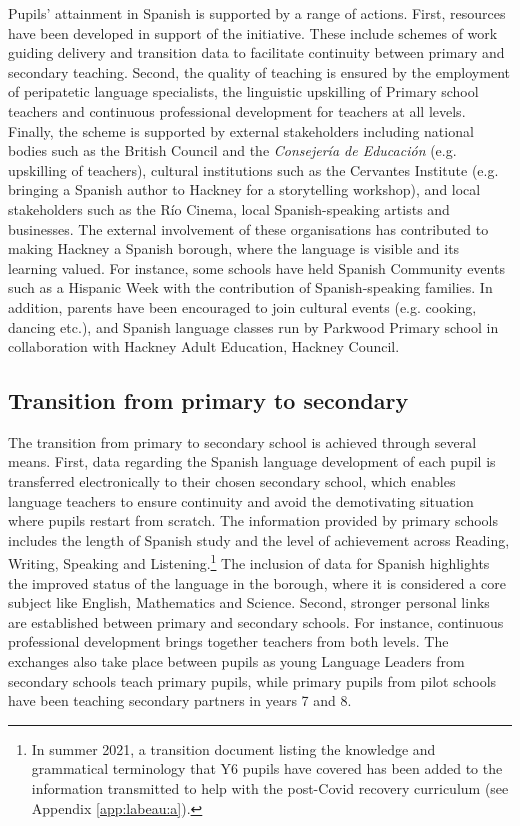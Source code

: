 \documentclass[output=paper]{langscibook}
\begin{document}
Pupils’ attainment in Spanish is supported by a range of actions. First, resources have been developed in support of the initiative. These include schemes of work guiding delivery and transition data to facilitate continuity between primary and secondary teaching. Second, the quality of teaching is ensured by the employment of peripatetic language specialists, the linguistic upskilling of Primary school teachers and continuous professional development for teachers at all levels. Finally, the scheme is supported by external stakeholders including national bodies such as the British Council and the \textit{Consejería de Educación} (e.g. upskilling of teachers), cultural institutions such as the Cervantes Institute (e.g. bringing a Spanish author to Hackney for a storytelling workshop), and local stakeholders such as the Río Cinema, local Spanish-speaking artists and businesses. The external involvement of these organisations has contributed to making Hackney a Spanish borough, where the language is visible and its learning valued. For instance, some schools have held Spanish Community events such as a Hispanic Week with the contribution of Spanish-speaking families. In addition, parents have been encouraged to join cultural events (e.g. cooking, dancing etc.), and Spanish language classes run by Parkwood Primary school in collaboration with Hackney Adult Education, Hackney Council.

\subsection{Transition from primary to secondary}

The transition from primary to secondary school is achieved through several means. First, data regarding the Spanish language development of each pupil is transferred electronically to their chosen secondary school, which enables language teachers to ensure continuity and avoid the demotivating situation where pupils restart from scratch. The information provided by primary schools includes the length of Spanish study and the level of achievement across Reading, Writing, Speaking and Listening.\footnote{In summer 2021, a transition document listing the knowledge and grammatical terminology that Y6 pupils have covered has been added to the information transmitted to help with the post-Covid recovery curriculum (see Appendix \ref{app:labeau:a}).} The inclusion of data for Spanish highlights the improved status of the language in the borough, where it is considered a core subject like English, Mathematics and Science. Second, stronger personal links are established between primary and secondary schools. For instance, continuous professional development brings together teachers from both levels. The exchanges also take place between pupils as young Language Leaders from secondary schools teach primary pupils, while primary pupils from pilot schools have been teaching secondary partners in years 7 and 8.
\end{document}
